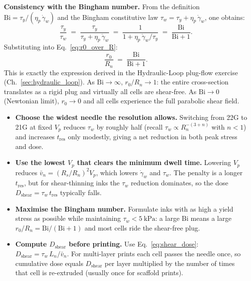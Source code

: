 \documentclass[11pt,a4paper]{article}
\newcommand{\gd}{\dot{\gamma}}
\newcommand{\Bi}{\mathrm{Bi}}
\begin{document}
\begin{derivationbox}[title={DERIVATION --- Plug radius and shear-free cell fraction}]
\medskip
\textbf{Consistency with the Bingham number.}
From the definition $\Bi=\tau_y/(\eta_p\,\gd_w)$ and the Bingham
constitutive law $\tau_w=\tau_y+\eta_p\,\gd_w$, one obtains:
\[
\frac{\tau_y}{\tau_w}
  \;=\; \frac{\tau_y}{\tau_y+\eta_p\,\gd_w}
  \;=\; \frac{1}{1+\eta_p\,\gd_w/\tau_y}
  \;=\; \frac{\Bi}{\Bi+1}.
\]
Substituting into Eq.~\ref{eq:r0_over_R}:
\begin{equation}
\frac{r_0}{R_n} \;=\; \frac{\Bi}{\Bi+1}.
\label{eq:r0_Bi}
\end{equation}
This is exactly the expression derived in the Hydraulic-Loop
plug-flow exercise (Ch.~\ref{sec:hydraulic_loop}).
As $\Bi\to\infty$, $r_0/R_n\to 1$: the entire cross-section
translates as a rigid plug and virtually all cells are shear-free.
As $\Bi\to 0$ (Newtonian limit), $r_0\to 0$ and all cells experience
the full parabolic shear field.
\end{derivationbox}

\begin{inpracticebox}[title={IN PRACTICE --- Designing for cell viability in DIW}]
\begin{itemize}[leftmargin=1.4em,itemsep=3pt]
\item \textbf{Choose the widest needle the resolution allows.}
  Switching from 22G to 21G at fixed $V_p$ reduces $\tau_w$ by
  roughly half (recall $\tau_w\propto R_n^{-(3+n)}$ with $n<1$) and
  increases $t_\mathrm{res}$ only modestly, giving a net reduction in
  both peak stress and dose.
\item \textbf{Use the lowest $V_p$ that clears the minimum dwell time.}
  Lowering $V_p$ reduces $\bar v_n=(R_s/R_n)^2 V_p$, which lowers
  $\gd_w$ and $\tau_w$. The penalty is a longer $t_\mathrm{res}$, but
  for shear-thinning inks the $\tau_w$ reduction dominates, so the dose
  $D_\mathrm{shear}=\tau_w\,t_\mathrm{res}$ typically falls.
\item \textbf{Maximise the Bingham number.}
  Formulate inks with as high a yield stress as possible while
  maintaining $\tau_w<\SI{5}{\kPa}$: a large $\Bi$ means a large
  $r_0/R_n=\Bi/(\Bi+1)$ and most cells ride the shear-free plug.
\item \textbf{Compute $D_\mathrm{shear}$ before printing.}
  Use Eq.~\ref{eq:shear_dose}: $D_\mathrm{shear}=\tau_w\,L_n/\bar v_n$.
  For multi-layer prints each cell passes the needle once, so cumulative
  dose equals $D_\mathrm{shear}$ per layer multiplied by the number of
  times that cell is re-extruded (usually once for scaffold prints).
\end{itemize}
\end{inpracticebox}
\end{document}
